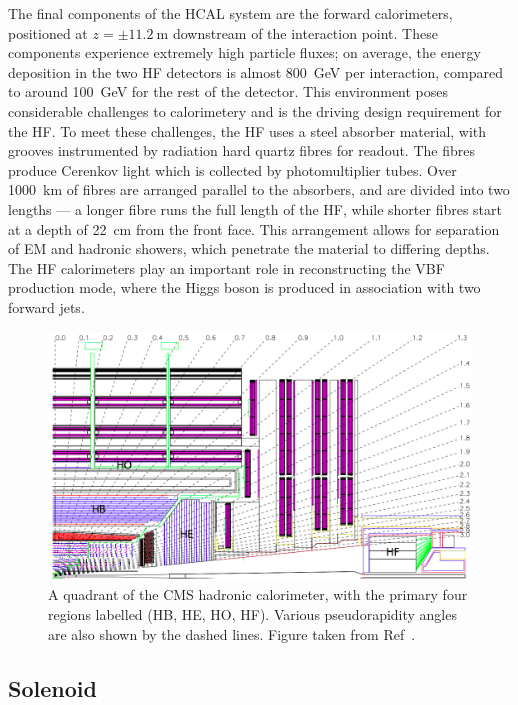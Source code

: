 The final components of the HCAL system are the forward calorimeters, positioned at $z=\pm11.2~\mathrm{m}$ downstream of the interaction point. These components experience extremely high particle fluxes; on average, the energy deposition in the two HF detectors is almost 800~GeV per interaction, compared to around 100~GeV for the rest of the detector. This environment poses considerable challenges to calorimetery and is the driving design requirement for the HF. To meet these challenges, the HF uses a steel absorber material, with grooves instrumented by radiation hard quartz fibres for readout. The fibres produce Cerenkov light which is collected by photomultiplier tubes. Over 1000~km of fibres are arranged parallel to the absorbers, and are divided into two lengths --- a longer fibre runs the full length of the HF, while shorter fibres start at a depth of 22~cm from the front face. This arrangement allows for separation of EM and hadronic showers, which penetrate the material to differing depths. The HF calorimeters play an important role in reconstructing the VBF \Hee production mode, where the Higgs boson is produced in association with two forward jets.

\begin{figure}[htbp!]
\centering
\includegraphics[width =0.75\linewidth]{Figures/Detector/CMS/HCAL_quadrant.png}\hfill \caption[The CMS hadronic calorimeter.]{A quadrant of the CMS hadronic calorimeter, with the primary four regions labelled (HB, HE, HO, HF). Various pseudorapidity angles are also shown by the dashed lines. Figure taken from Ref~\cite{CMS}.}
\label{fig:cms_hcal}
\end{figure}

\subsection{Solenoid}

